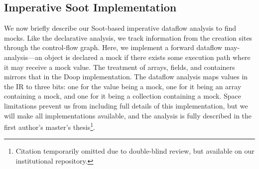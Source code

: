 \subsection{Imperative Soot Implementation}
\label{subsec:soot}
We now briefly describe our Soot-based imperative dataflow analysis to find mocks. Like the declarative analysis, we track information from the creation sites through the control-flow graph. Here, we implement a forward dataflow may-analysis---an object is declared a mock if there exists some execution path where it may receive a mock value. The treatment of arrays, fields, and containers mirrors that in the Doop implementation. The dataflow analysis maps values in the IR to three bits: one for the value being a mock, one for it being an array containing a mock, and one for it being a collection containing a mock. %
Space limitations prevent us from including full details of this implementation, but we will make all implementations available, and the analysis is fully described in the first author's master's thesis\footnote{Citation temporarily omitted due to double-blind review, but available on our institutional repository.}.







